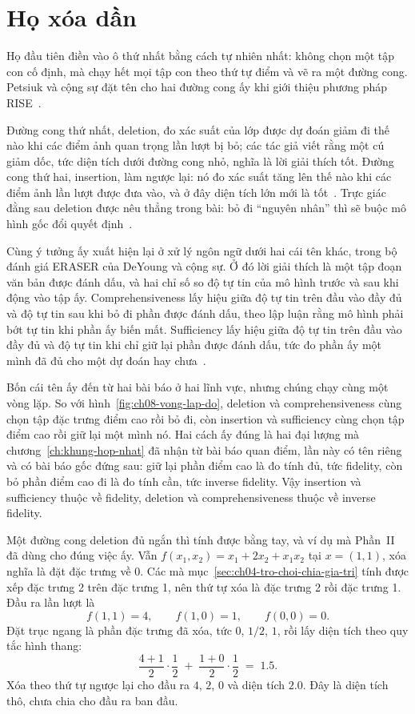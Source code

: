 \section{Họ xóa dần}
\label{sec:ch08-ho-xoa-dan}

%
%
%
%
Họ đầu tiên điền vào ô thứ nhất bằng cách tự nhiên nhất: không chọn một tập con
cố định, mà chạy hết mọi tập con theo thứ tự điểm và vẽ ra một đường cong.
Petsiuk và cộng sự đặt tên cho hai đường cong ấy khi giới thiệu phương pháp
RISE~\autocite{mrise}.

Đường cong thứ nhất, deletion, đo xác suất của lớp được dự đoán giảm đi thế nào
khi các điểm ảnh quan trọng lần lượt bị bỏ; các tác giả viết rằng một cú giảm
dốc, tức diện tích dưới đường cong nhỏ, nghĩa là lời giải thích tốt. Đường cong
thứ hai, insertion, làm ngược lại: nó đo xác suất tăng lên thế nào khi các điểm
ảnh lần lượt được đưa vào, và ở đây diện tích lớn mới là tốt~\autocite{mrise}.
Trực giác đằng sau deletion được nêu thẳng trong bài: bỏ đi \enquote{nguyên
nhân} thì sẽ buộc mô hình gốc đổi quyết định~\autocite{mrise}.

Cùng ý tưởng ấy xuất hiện lại ở xử lý ngôn ngữ dưới hai cái tên khác, trong bộ
đánh giá ERASER của DeYoung và cộng sự. Ở đó lời giải thích là một tập đoạn văn
bản được đánh dấu, và hai chỉ số so độ tự tin của mô hình trước và sau khi động
vào tập ấy. Comprehensiveness lấy hiệu giữa độ tự tin trên đầu vào đầy đủ và độ
tự tin sau khi bỏ đi phần được đánh dấu, theo lập luận rằng mô hình phải bớt tự
tin khi phần ấy biến mất. Sufficiency lấy hiệu giữa độ tự tin trên đầu vào đầy
đủ và độ tự tin khi chỉ giữ lại phần được đánh dấu, tức đo phần ấy một mình đã
đủ cho một dự đoán hay chưa~\autocite{meraser}.

Bốn cái tên ấy đến từ hai bài báo ở hai lĩnh vực, nhưng chúng chạy cùng một
vòng lặp. So với
hình~\ref{fig:ch08-vong-lap-do}, deletion và comprehensiveness cùng chọn tập
đặc trưng điểm cao rồi bỏ đi, còn insertion và sufficiency cùng chọn tập điểm
cao rồi giữ lại một mình nó. Hai cách ấy đúng là hai đại lượng mà
chương~\ref{ch:khung-hop-nhat} đã nhận từ bài báo quan điểm, lần này có tên
riêng và có bài báo gốc đứng sau: giữ lại phần điểm cao là đo tính đủ, tức
fidelity, còn bỏ phần điểm cao đi là đo tính cần, tức inverse fidelity. Vậy
insertion và sufficiency thuộc về fidelity, deletion và comprehensiveness thuộc
về inverse fidelity.

Một đường cong deletion đủ ngắn thì tính được bằng tay, và ví dụ mà Phần~II đã
dùng cho đúng việc ấy. Vẫn $f(x_1,x_2) = x_1 + 2x_2 + x_1x_2$ tại $x = (1,1)$,
xóa nghĩa là đặt đặc trưng về 0. Các  mà
mục~\ref{sec:ch04-tro-choi-chia-gia-tri} tính được xếp đặc trưng 2 trên đặc
trưng 1, nên thứ tự xóa là đặc trưng 2 rồi đặc trưng 1. Đầu ra lần lượt là
\[
  f(1,1) = 4, \qquad f(1,0) = 1, \qquad f(0,0) = 0 .
\]
Đặt trục ngang là phần đặc trưng đã xóa, tức $0$, $1/2$, $1$, rồi lấy diện tích
theo quy tắc hình thang:
\[
  \frac{4+1}{2}\cdot\frac{1}{2} \;+\; \frac{1+0}{2}\cdot\frac{1}{2}
  \;=\; 1.5 .
\]
Xóa theo thứ tự ngược lại cho đầu ra $4$, $2$, $0$ và diện tích $2.0$. Đây là
diện tích thô, chưa chia cho đầu ra ban đầu.

